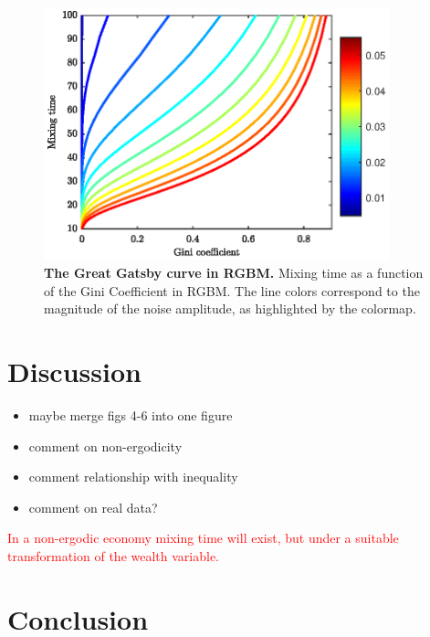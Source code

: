 \documentclass[11pt]{article}
\numberwithin{equation}{section}
\begin{document}
\begin{figure}[t!]
\includegraphics[width=10cm]{figs/fig_great_gatsby.eps}
\caption{\textbf{The Great Gatsby curve in RGBM.} Mixing time as a function of the Gini Coefficient in RGBM. The line colors correspond to the magnitude of the noise amplitude, as highlighted by the colormap.\label{fig:rgbm-great-gatsby}}
\end{figure}




\section{Discussion}
\begin{itemize}
    \item maybe merge figs 4-6 into one figure
    \item comment on non-ergodicity
    \item comment relationship with inequality
    \item comment on real data?
\end{itemize}

\textcolor{red}{In a non-ergodic economy mixing time will exist, but under a suitable transformation of the wealth variable. }

\section{Conclusion}\label{sec:conclusion}

\end{document}
